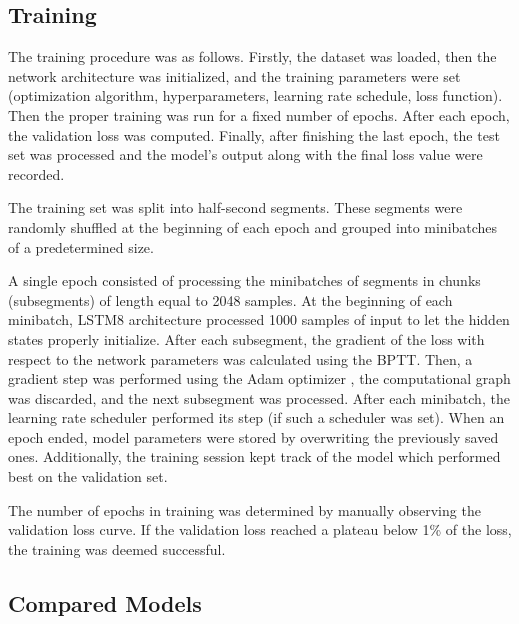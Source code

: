 \subsection{Training}
\label{sec:diode_clipper_training}

The training procedure was as follows. Firstly, the dataset was loaded, then the network architecture was initialized, and the training parameters were set (optimization algorithm, hyperparameters, learning rate schedule, loss function). Then the proper training was run for a fixed number of epochs. After each epoch, the validation loss was computed. Finally, after finishing the last epoch, the test set was processed and the model's output along with the final loss value were recorded.

The training set was split into half-second segments. These segments were randomly shuffled at the beginning of each epoch and grouped into minibatches of a predetermined size.

A single epoch consisted of processing the minibatches of segments in chunks (subsegments) of length equal to 2048 samples. At the beginning of each minibatch, \ac{LSTM}8 architecture processed 1000 samples of input to let the hidden states properly initialize. After each subsegment, the gradient of the loss with respect to the network parameters was calculated using the \ac{BPTT}. Then, a gradient step was performed using the Adam optimizer \cite{Kingma2017}, the computational graph was discarded, and the next subsegment was processed. After each minibatch, the learning rate scheduler performed its step (if such a scheduler was set). When an epoch ended, model parameters were stored by overwriting the previously saved ones. Additionally, the training session kept track of the model which performed best on the validation set.

The number of epochs in training was determined by manually observing the validation loss curve. If the validation loss reached a plateau below 1\% of the loss, the training was deemed successful.

\subsection{Compared Models}
\label{sec:diode_clipper_models}

